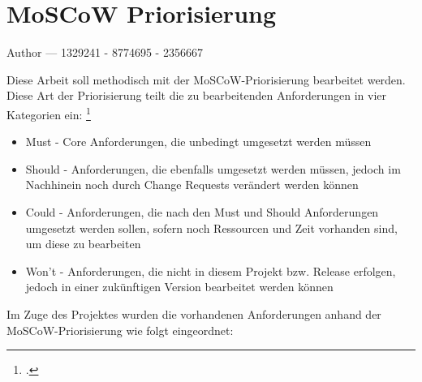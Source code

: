 \documentclass[12pt, a4paper]{report}
\makeatletter
\newcommand{\sectionauthor}[1]{%
  {\parindent0pt\vspace*{-5pt}%
  \large{Author --- }
  \linespread{1.1}\large\scshape#1%
  \par\nobreak\vspace*{35pt} }
  \@afterheading%
}
\makeatother
\begin{document}
\section{MoSCoW Priorisierung}
\sectionauthor{1329241 - 8774695 - 2356667}
Diese Arbeit soll methodisch mit der MoSCoW-Priorisierung bearbeitet werden. Diese Art der Priorisierung teilt die zu bearbeitenden Anforderungen in vier Kategorien ein:
\footcite[vgl.][90]{Projektmanagement}
\begin{itemize}
\item Must - Core Anforderungen, die unbedingt umgesetzt werden müssen
\item Should - Anforderungen, die ebenfalls umgesetzt werden müssen, jedoch im Nachhinein noch durch Change Requests verändert werden können
\item Could - Anforderungen, die nach den Must und Should Anforderungen umgesetzt werden sollen, sofern noch Ressourcen und Zeit vorhanden sind, um diese zu bearbeiten
\item Won't - Anforderungen, die nicht in diesem Projekt bzw. Release erfolgen, jedoch in einer zukünftigen Version bearbeitet werden können 
\end{itemize}
Im Zuge des Projektes wurden die vorhandenen Anforderungen anhand der MoSCoW-Priorisierung wie folgt eingeordnet:
\end{document}
